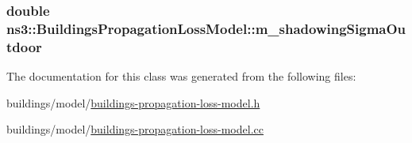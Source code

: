 \subsubsection[{\texorpdfstring{m\+\_\+shadowing\+Sigma\+Outdoor}{m_shadowingSigmaOutdoor}}]{\setlength{\rightskip}{0pt plus 5cm}double ns3\+::\+Buildings\+Propagation\+Loss\+Model\+::m\+\_\+shadowing\+Sigma\+Outdoor\hspace{0.3cm}{\ttfamily [protected]}}\hypertarget{classns3_1_1BuildingsPropagationLossModel_a60ae8ad7436c00d12e31f9ab1a4a3013}{}\label{classns3_1_1BuildingsPropagationLossModel_a60ae8ad7436c00d12e31f9ab1a4a3013}


The documentation for this class was generated from the following files\+:\begin{DoxyCompactItemize}
\item 
buildings/model/\hyperlink{buildings-propagation-loss-model_8h}{buildings-\/propagation-\/loss-\/model.\+h}\item 
buildings/model/\hyperlink{buildings-propagation-loss-model_8cc}{buildings-\/propagation-\/loss-\/model.\+cc}\end{DoxyCompactItemize}
